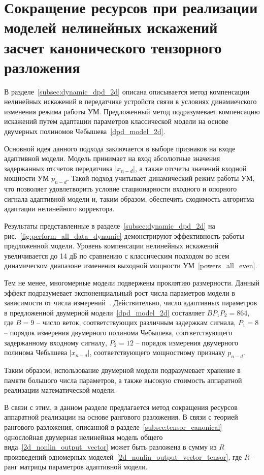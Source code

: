 \section{Сокращение ресурсов при реализации моделей нелинейных искажений засчет канонического тензорного разложения}

В разделе~\ref{subsec:dynamic_dpd_2d} описана описывается метод компенсации нелинейных искажений в передатчике устройств связи в условиях динамиечского изменения режима работы УМ. Предложенный метод подразумевает компенсацию искажений путем адаптации параметров классической модели на основе двумерных полиномов Чебышева~\eqref{dpd_model_2d}. 

Основной идея данного подхода заключается в выборе признаков на входе адаптивной модели. Модель принимает на вход абсолютные значения задержанных отсчетов передатчика $|x_{n-d}|$, а также отсчеты значений входной мощности УМ $p_{n-d}$. Такой подход учитывает динамический режим работы УМ, что позволяет удовлетворить условие стационарности входного и опорного сигнала адаптивной модели и, таким образом, обеспечить сходимость алгоритма адаптации нелинейного корректора.

Результаты представленные в разделе~\ref{subsec:dynamic_dpd_2d} на рис.~\ref{fig:perform_all_data_dynamic} демонстрируют эффективность работы предложенной модели. Уровень компенсации нелинейных искажений увеличивается до 14 дБ по сравнению с классическим подходом во всем динамическом диапазоне изменения выходной мощности УМ~\eqref{powers_all_even}.

Тем не менее, многомерные модели подвержены проклятию размерности. Данный эффект подразумевает экспоненциальный рост числа параметров модели в зависимости от числа измерений~\cite{pa_models}. Действительно, число адаптивных параметров в предложенной двумерной модели~\eqref{dpd_model_2d} составляет $BP_1P_2=864$, где $B=9$ -- число веток, соответствующих различным задержкам сигнала, $P_1=8$ -- порядок измерения двумерного полинома Чебышева, соответствующего задержанному входному сигналу, $P_2=12$ -- порядок измерения двумерного полинома Чебышева $|x_{n-d}|$, соответствующего мощностному признаку $p_{n-d}$.

Таким образом, использование двумерной модели подразумевает хранение в памяти большого числа параметров, а также высокую стоимость аппаратной реализации математической модели.

В связи с этим, в данном разделе предлагается метод сокращения ресурсов аппаратной реализации на основе рангового разложения. В связи с теорией рангового разложения, описанной в разделе~\ref{subsec:tensor_canonical} однослойная двумерная нелинейная модель общего вида~\eqref{2d_nonlin_output_vector} может быть разложена в сумму из $R$ произведений одномерных моделей~\eqref{2d_nonlin_output_vector_tensor}, где $R$ -- ранг матрицы параметров адаптивной модели. 

